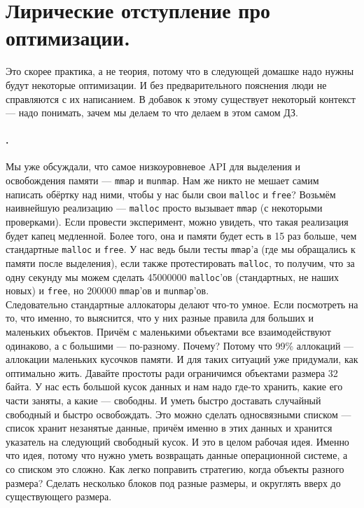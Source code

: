 \documentclass{article}
\begin{document}
    \section{Лирические отступление про оптимизации.}
    Это скорее практика, а не теория, потому что в следующей домашке надо нужны будут некоторые оптимизации. И без предварительного пояснения люди не справляются с их написанием. В добавок к этому существует некоторый контекст --- надо понимать, зачем мы делаем то что делаем в этом самом ДЗ.
    \paragraph{.}
    Мы уже обсуждали, что самое низкоуровневое API для выделения и освобождения памяти --- \texttt{mmap} и \texttt{munmap}. Нам же никто не мешает самим написать обёртку над ними, чтобы у нас были свои \texttt{malloc} и \texttt{free}? Возьмём наивнейшую реализацию --- \texttt{malloc} просто вызывает \texttt{mmap} (с некоторыми проверками). Если провести эксперимент, можно увидеть, что такая реализация будет капец медленной. Более того, она и памяти будет есть в 15 раз больше, чем стандартные \texttt{malloc} и \texttt{free}. У нас ведь были тесты \texttt{mmap}'а (где мы обращались к памяти после выделения), если также протестировать \texttt{malloc}, то получим, что за одну секунду мы можем сделать 45000000 \texttt{malloc}'ов (стандартных, не наших новых) и \texttt{free}, но 200000 \texttt{mmap}'ов и \texttt{munmap}'ов.\\
    Следовательно стандартные аллокаторы делают что-то умное. Если посмотреть на то, что именно, то выяснится, что у них разные правила для больших и маленьких объектов. Причём с маленькими объектами все взаимодействуют одинаково, а с большими --- по-разному. Почему? Потому что 99\% аллокаций --- аллокации маленьких кусочков памяти. И для таких ситуаций уже придумали, как оптимально жить. Давайте простоты ради ограничимся объектами размера 32 байта. У нас есть большой кусок данных и нам надо где-то хранить, какие его части заняты, а какие --- свободны. И уметь быстро доставать случайный свободный и быстро освобождать. Это можно сделать односвязными списком --- список хранит незанятые данные, причём именно в этих данных и хранится указатель на следующий свободный кусок. И это в целом рабочая идея. Именно что идея, потому что нужно уметь возвращать данные операционной системе, а со списком это сложно. Как легко поправить стратегию, когда объекты разного размера? Сделать несколько блоков под разные размеры, и округлять вверх до существующего размера.
\end{document}
